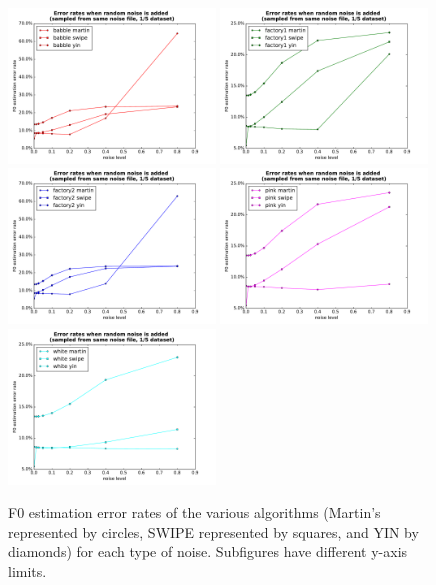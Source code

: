 \documentclass[11pt,a4paper]{report}
\begin{document}
\begin{figure}[htbp]
  \centering
  \includegraphics[width=0.49\textwidth]{error_rates_random_noise_babble.pdf}
  \includegraphics[width=0.49\textwidth]{error_rates_random_noise_factory1.pdf}
  \includegraphics[width=0.49\textwidth]{error_rates_random_noise_factory2.pdf}
  \includegraphics[width=0.49\textwidth]{error_rates_random_noise_pink.pdf}
  \includegraphics[width=0.49\textwidth]{error_rates_random_noise_white.pdf}
  \caption[F0 estimation error rates of the various algorithms for each type of noise.]{F0 estimation error rates of the various algorithms (Martin's represented by circles, SWIPE represented by squares, and YIN by diamonds) for each type of noise.
    Subfigures have different y-axis limits.}
  \label{fig:random-noise-same-audio}
\end{figure}
\end{document}
